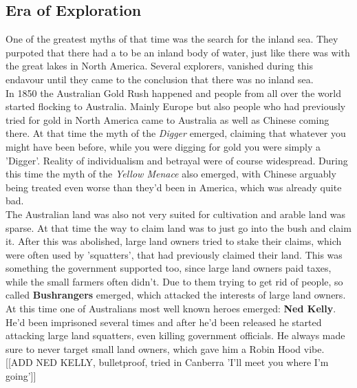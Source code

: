 \documentclass{article}
\begin{document}
	\subsection{Era of Exploration}
	One of the greatest myths of that time was the search for the inland sea. They purpoted that there had a to be an inland body of water, just like there was with the great lakes in North America. Several explorers, vanished during this endavour until they came to the conclusion that there was no inland sea. \\
	In 1850 the Australian Gold Rush happened and people from all over the world started flocking to Australia. Mainly Europe but also people who had previously tried for gold in North America came to Australia as well as Chinese coming there. At that time the myth of the \textit{Digger} emerged, claiming that whatever you might have been before, while you were digging for gold you were simply a 'Digger'. Reality of individualism and betrayal were of course widespread. During this time the myth of the \textit{Yellow Menace} also emerged, with Chinese arguably being treated even worse than they'd been in America, which was already quite bad. \\
	The Australian land was also not very suited for cultivation and arable land was sparse. At that time the way to claim land was to just go into the bush and claim it. After this was abolished, large land owners tried to stake their claims, which were often used by 'squatters', that had previously claimed their land. This was something the government supported too, since large land owners paid taxes, while the small farmers often didn't. Due to them trying to get rid of people, so called \textbf{Bushrangers} emerged, which attacked the interests of large land owners. At this time one of Australians most well known heroes emerged: \textbf{Ned Kelly}. He'd been imprisoned several times and after he'd been released he started attacking large land squatters, even killing government officials. He always made sure to never target small land owners, which gave him a Robin Hood vibe. [[ADD NED KELLY, bulletproof, tried in Canberra 'I'll meet you where I'm going']]
\end{document}

